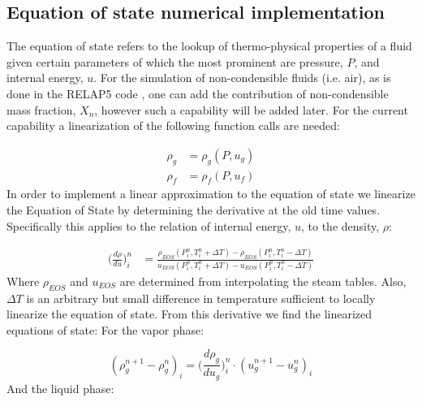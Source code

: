 \documentclass[11pt,letterpaper,titlepage]{article}
\begin{document}
\newpage
\subsection{Equation of state numerical implementation}
The equation of state refers to the lookup of thermo-physical properties of a fluid given certain parameters of which the most prominent are pressure, $P$, and internal energy, $u$. For the simulation of non-condensible fluids (i.e. air), as is done in the RELAP5 code \cite{RELAP5Vol6}, one can add the contribution of non-condensible mass fraction, $X_n$, however such a capability will be added later. For the current capability a linearization of the following function calls are needed:

\begin{equation*}
\begin{aligned}
\rho_g &= \rho_g(P,u_g)\\
\rho_f &= \rho_f(P,u_f)
\end{aligned}
\end{equation*}
\newline
In order to implement a linear approximation to the equation of state we linearize the Equation of State by determining the derivative at the old time values. Specifically this applies to the relation of internal energy, $u$, to the density, $\rho$:

\begin{equation*}
\begin{aligned}
\biggr( \frac{d\rho}{du} \biggr)_i^n
&=\frac{\rho_{EOS}(P_i^n,T_i^n+\Delta T) -\rho_{EOS}(P_i^n,T_i^n-\Delta T) }{u_{EOS}(P_i^n,T_i^n+\Delta T)-u_{EOS}(P_i^n,T_i^n-\Delta T)} 
\end{aligned}
\end{equation*}
\newline
Where $\rho_{EOS}$ and $u_{EOS}$ are determined from interpolating the steam tables. Also, $\Delta T$ is an arbitrary but small difference in temperature sufficient to locally linearize the equation of state.
From this derivative we find the linearized equations of state:\newline
\newline
For the vapor phase:

\begin{equation} \label{eq:vapEOS}
(\rho_{g}^{n+1} - \rho_{g}^{n})_i= \biggr( \frac{d\rho_g}{du_g} \biggr)_i^n \cdot (u_{g}^{n+1} - u_{g}^{n})_i
\end{equation}
\newline
\noindent And the liquid phase:
\end{document}
